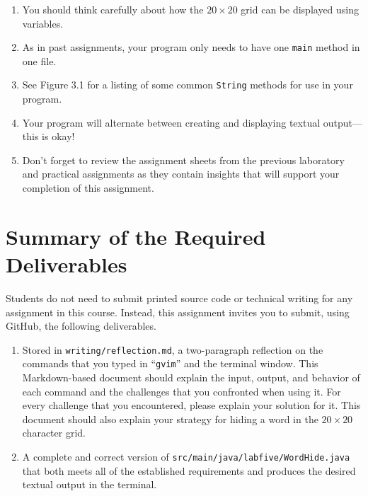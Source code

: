 \documentclass[11pt]{article}
\newcommand{\mainprogramsource}{\lstinline{src/main/java/labfive/WordHide.java}}
\newcommand{\reflection}{\lstinline{writing/reflection.md}}
\newcommand{\command}[1]{``\lstinline{#1}''}
\newcommand{\program}[1]{\lstinline{#1}}
\begin{document}
\vspace*{-.1in}

\begin{enumerate}
  \setlength{\itemsep}{0pt}

\item You should think carefully about how the $20 \times 20$ grid can be
  displayed using variables.

\item As in past assignments, your program only needs to have one {\tt main}
  method in one file.

\item See Figure 3.1 for a listing of some common \program{String} methods for
  use in your program.

\item Your program will alternate between creating and displaying textual
  output---this is okay!

\item Don't forget to review the assignment sheets from the previous laboratory
  and practical assignments as they contain insights that will support your
  completion of this assignment.

\end{enumerate}
\vspace*{-.2in}

\section*{Summary of the Required Deliverables}

\noindent Students do not need to submit printed source code or technical writing for any assignment in this course.
Instead, this assignment invites you to submit, using GitHub, the following deliverables.

\begin{enumerate}

  \setlength{\itemsep}{0in}

\item Stored in \reflection{}, a two-paragraph reflection on the commands that you typed in \command{gvim} and the
  terminal window. This Markdown-based document should explain the input, output, and behavior of each command and the
  challenges that you confronted when using it. For every challenge that you encountered, please explain your solution
  for it. This document should also explain your strategy for hiding a word in the $20 \times 20$ character grid.

\item A complete and correct version of \mainprogramsource{} that both meets all of the established requirements and
  produces the desired textual output in the terminal.

\end{enumerate}
\end{document}
